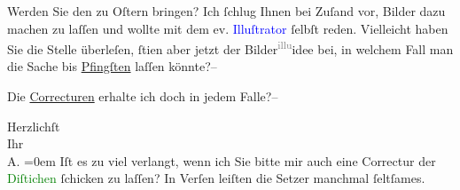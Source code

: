 \pstart
           Werden Sie den \label{K_L02998-2v}\label{K_L02998-2h} zu Oſtern bringen? Ich ſchlug Ihnen bei Zuſand
               vor, Bilder dazu machen zu laſſen und wollte mit dem ev. \textcolor{blue}{Illuſtrator}{}\ledrightnote{{$\rightarrow$}\textcolor{blue}{Berta Czegka}} ſelbſt reden. Vielleicht haben
               Sie die Stelle überleſen, ſti{\geminationm}en aber jetzt {\pb}der Bilder\substVorne{}\textsuperscript{\textcolor{gray}{illu}}\substDazwischen{}idee\substHinten{} bei, in welchem Fall man die Sache bis \uline{Pfingſten} laſſen könnte?–\pend
           
\pstart
           Die \uline{Correcturen} erhalte ich doch in jedem Falle?–\pend
           
\pstart
           Herzlichſt {\\[\baselineskip]}Ihr {\\[\baselineskip]}\spacefill\mbox{A.}\pend
           \leftskip=0em{}
\pstart
           Iſt es zu viel verlangt, wenn ich Sie bitte mir auch eine Correctur der \textcolor{green}{Diſtichen}{}\ledrightnote{{$\rightarrow$}\textcolor{green}{Schiller-Feier}} ſchicken zu laſſen?
               In Verſen leiſten die Setzer {\pb}manchmal
               ſeltſames.\pend
           \endnumbering{}  
      
